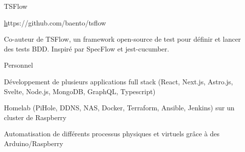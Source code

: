 
\begin{cventries}
  \cventrywithouttitleanddate
    {TSFlow} %
    {} %
    {
      \begin{cvitems} %
        \item {\href{https://github.com/baento/tsflow}https://github.com/baento/tsflow}
        \item {Co-auteur de TSFlow, un framework open-source de test pour définir et lancer des tests BDD. Inspiré par SpecFlow et jest-cucumber.}
      \end{cvitems}
    }

  \cventry
    {} %
    {Personnel} %
    {} %
    {} %
    {
      \begin{cvitems} %
        \item {Développement de plusieurs applications full stack (React, Next.js, Astro.js, Svelte, Node.js, MongoDB, GraphQL, Typescript)}
        \item {Homelab (PiHole, DDNS, NAS, Docker, Terraform, Ansible, Jenkins) sur un cluster de Raspberry}
		\item {Automatisation de différents processus physiques et virtuels grâce à des Arduino/Raspberry}
      \end{cvitems}
    }

\end{cventries}